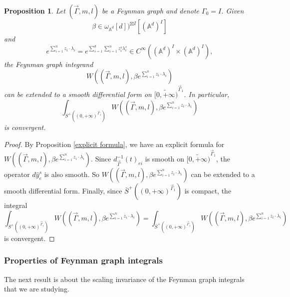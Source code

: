 \documentclass[11pt]{amsart}
\newtheorem{prop}[thm]{Proposition}
\theoremstyle{definition}
\theoremstyle{remark}
\numberwithin{equation}{section}
\begin{document}
\begin{prop}
    Let $(\vec{\Gamma},m,l)$ be a Feynman graph and denote $\Gamma_{0}= I$. 
    Given 
    $$
    \beta\in \omega_{\mathbb{A}^{d}}[d])^{\boxtimes I}[(\mathbb{A}^{d})^{ I}]
    $$
    and
    $$
    e^{\sum_{i=1}^{n}z_{i}\cdot\lambda_{i}}=e^{\sum_{s=1}^{d}\sum_{i=1}^{n}z^{s}_{i}\lambda^{s}_{i}}\in C^{\infty}((\mathbb{A}^{d})^{ I}\times (\mathbb{A}^{d})^{ I}),
    $$
    the Feynman graph integrand
    $$
    W((\vec{\Gamma},m,l),\beta e^{\sum_{i=1}^{n}z_{i}\cdot\lambda_{i}})
    $$
    can be extended to a smooth differential form on $\widetilde{[0,+\infty)}^{\vec{\Gamma}_{1}}$. In particular,
    $$
    \int_{S^{+}((0,+\infty)^{\vec{\Gamma}_{1}})}W((\vec{\Gamma},m,l),\beta e^{\sum_{i=1}^{n}z_{i}\cdot\lambda_{i}})
    $$
    is convergent.
\end{prop}
\begin{proof}
    By Proposition \ref{explicit formula}, we have an explicit formula for $
    W((\vec{\Gamma},m,l),\beta e^{\sum_{i=1}^{n}z_{i}\cdot\lambda_{i}})
    $. Since $d^{-1}_{\vec{\Gamma}}(t)_{ei}$ is smooth on $\widetilde{[0,+\infty)}^{\vec{\Gamma}_{1}}$, the operator $d\hat{y}_{e}^{s}$ is also smooth. So $
    W((\vec{\Gamma},m,l),\beta e^{\sum_{i=1}^{n}z_{i}\cdot\lambda_{i}})
    $ can be extended to a smooth differential form. Finally, since $\bar{S}^{+}((0,+\infty)^{\vec{\Gamma}_{1}})$ is compact, the integral
    $$
    \int_{S^{+}((0,+\infty)^{\vec{\Gamma}_{1}})}W((\vec{\Gamma},m,l),\beta e^{\sum_{i=1}^{n}z_{i}\cdot\lambda_{i}})=
    \int_{\bar{S}^{+}((0,+\infty)^{\vec{\Gamma}_{1}})}W((\vec{\Gamma},m,l),\beta e^{\sum_{i=1}^{n}z_{i}\cdot\lambda_{i}})
    $$
    is convergent.
\end{proof}

\subsubsection{Properties of Feynman graph integrals}

The next result is about the scaling invariance of the Feynman graph integrals that we are studying.
\end{document}
